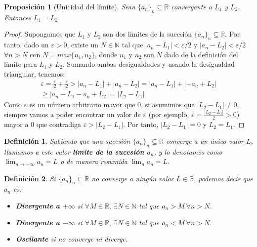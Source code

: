 \documentclass{article}
\newtheorem{define}{Definición}
\newtheorem{prop}{Proposición}
\begin{document}
\begin{prop}[Unicidad del límite]
	Sean $\{ a_n\}_n \subseteq \mathbb{R}$ convergente a $L_1$ y $L_2$. Entonces $L_1 = L_2$.
\end{prop}
\begin{proof}
	Supongamos que $L_1$ y $L_2$ son dos límites de la sucesión $\{ a_n\}_n \subseteq \mathbb{R}$. Por tanto, dado un $\varepsilon > 0$, existe un $N \in \mathbb{N}$ 
	tal que $|a_n - L_1| < \varepsilon/2$ y $|a_n - L_2| < \varepsilon/2\ $ $\forall n > N$ con $N=max\{n_1, n_2\}$, donde $n_1$ y $n_2$ son $N$ dado de la definición del límite para 
	$L_1$ y $L_2$. Sumando ambas desigualdades y usando la desigualdad triangular, tenemos:
	\begin{align*}
		\varepsilon = \frac{\varepsilon}{2} + \frac{\varepsilon}{2} > |a_n - L_1| + |a_n - L_2| = |a_n - L_1| + |-a_n + L_2| \\ \geq |a_n - L_1 - a_n + L_2| = |L_2 - L_1|
	\end{align*}
	Como $\varepsilon$ es un número arbitrario mayor que 0, si asumimos que $|L_2 - L_1| \neq 0$, siempre vamos a poder encontrar un valor de $\varepsilon$ (por ejemplo, 
	$\varepsilon = \frac{|L_2 - L_1|}{2} > 0$) mayor a 0 que contradiga $\varepsilon > |L_2 - L_1|$. Por tanto, $|L_2 - L_1| = 0$ y $L_2 = L_1$.
\end{proof}


\begin{define}
	Sabiendo que una sucesión $\{ a_n\}_n \subseteq \mathbb{R}$ converge a un único valor $L$, llamamos a este valor \textbf{límite de la sucesión $a_n$}, y lo denotamos como
	$\lim_{n\rightarrow +\infty} a_n = L$ o de manera resumida $\lim_{n} a_n = L$.
\end{define}


\begin{define}
	Si $\{ a_n\}_n \subseteq \mathbb{R}$ no converge a ningún valor $L\in\mathbb{R}$, podemos decir que $a_n$ es:
	\begin{itemize}
		\item
		\textbf{Divergente a $+\infty$} si $\forall M \in \mathbb{R},\ \exists N \in \mathbb{N}$ tal que $a_n > M\ \forall n>N$.
		
		\item
		\textbf{Divergente a $-\infty$} si $\forall M \in \mathbb{R},\ \exists N \in \mathbb{N}$ tal que $a_n < M\ \forall n>N$.
		
		\item
		\textbf{Oscilante} si no converge ni diverge.
	\end{itemize}
\end{define}
\end{document}
